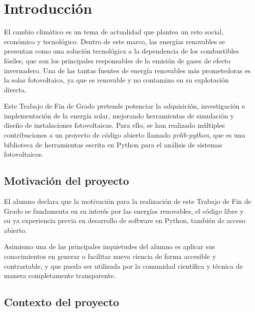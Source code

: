 \chapter{Introducción} \label{chp:intro}

El cambio climático es un tema de actualidad que plantea un reto social, económico y tecnológico. Dentro de este marco, las energías renovables se presentan como una solución tecnológica a la dependencia de los combustibles fósiles, que son los principales responsables de la emisión de gases de efecto invernadero. Una de las tantas fuentes de energía renovables más prometedoras es la solar fotovoltaica, ya que es renovable y no contamina en su explotación directa.

Este Trabajo de Fin de Grado pretende potenciar la adquisición, investigación e implementación de la energía solar, mejorando herramientas de simulación y diseño de instalaciones fotovoltaicas. Para ello, se han realizado múltiples contribuciones a un proyecto de código abierto llamado \textit{pvlib-python}, que es una biblioteca de herramientas escrita en Python para el análisis de sistemas fotovoltaicos.


\section{Motivación del proyecto} \label{sct:intro:motivacion}

El alumno declara que la motivación para la realización de este Trabajo de Fin de Grado se fundamenta en su interés por las energías renovables, el código libre y su ya experiencia previa en desarrollo de software en Python, también de acceso abierto.

Asimismo una de las principales inquietudes del alumno es aplicar sus conocimientos en generar o facilitar nueva ciencia de forma accesible y contrastable, y que pueda ser utilizada por la comunidad científica y técnica de manera completamente transparente.


\section{Contexto del proyecto} \label{sct:intro:contexto}

